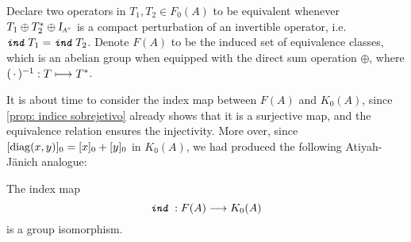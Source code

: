 Declare two operators in $T_1, T_2 \in F_0(A)$ to be equivalent whenever $T_1 \oplus T_2^* \oplus \sub\Id{A^n}$ is a compact perturbation of an invertible operator, i.e. $\texttt{\textit{ind}}\, T_1 = \texttt{\textit{ind}}\, T_2$. Denote $F(A)$ to be the induced set of equivalence classes, which is an abelian group when equipped with the direct sum operation $\oplus$, where $(\operatorname{\,\cdot\,})^{-1}: T \longmapsto T^*$. 

It is about time to consider the index map between $F(A)$ and $K_0(A)$, since \ref{prop: indice sobrejetivo} already shows that it is a surjective map, and the equivalence relation ensures the injectivity. More over, since $[\operatorname{diag}(x,y)]_0 = [x]_0+[y]_0$ in $K_0(A)$, we had produced the following Atiyah-Jänich analogue:

\begin{corolario}\label{corol:atiyah-janich}
The index map 
$$
\texttt{\textit{ind}}\, : F(A) \longrightarrow K_0(A)
$$ 
is a group isomorphism.
\end{corolario}


